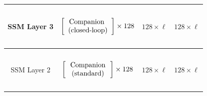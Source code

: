 \begin{table}[]
\begin{tabular}{@{}c|c|c|c@{}}
\multicolumn{1}{c|}{SSM Layer 3} & \begin{math}\begin{aligned}    \begin{matrix}    \text{\phantom{-}} \\    \end{matrix}    \\    \begin{bmatrix}    \text{\phantom{-} Companion \phantom{-} } \\ \text{(closed-loop)} \\    \end{bmatrix}    \times 128     \\    \begin{matrix}    \text{\phantom{-}} \\    \end{matrix}    \\\end{aligned}\end{math}                                                                                                                                                                        & $128 \times \ell$ & $128 \times \ell$ \\ \midrule
\multicolumn{1}{c|}{SSM Layer 2} & \begin{math}\begin{aligned}    \begin{matrix}    \text{\phantom{-}} \\    \end{matrix}    \\    \begin{bmatrix}    \text{\phantom{-} Companion \phantom{-}}  \\ \text{(standard)} \\    \end{bmatrix}    \times 128     \\    \begin{matrix}    \text{\phantom{-}} \\    \end{matrix}    \\\end{aligned}\end{math}                                                                                                                                                                             & $128 \times \ell$ & $128 \times \ell$ \\ \midrule

\end{tabular}
\end{table}

